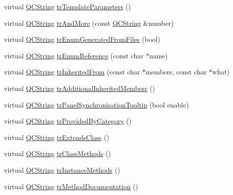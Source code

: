 \begin{DoxyCompactItemize}
\item 
virtual \mbox{\hyperlink{class_q_c_string}{Q\+C\+String}} \mbox{\hyperlink{class_translator_korean_aeae11aa112012a4945a724857f636acf}{tr\+Template\+Parameters}} ()
\item 
virtual \mbox{\hyperlink{class_q_c_string}{Q\+C\+String}} \mbox{\hyperlink{class_translator_korean_abfd2acd5bfd7852b8184b7a9c630ffc4}{tr\+And\+More}} (const \mbox{\hyperlink{class_q_c_string}{Q\+C\+String}} \&number)
\item 
virtual \mbox{\hyperlink{class_q_c_string}{Q\+C\+String}} \mbox{\hyperlink{class_translator_korean_a601868bc904ff732ec99ec5886066faa}{tr\+Enum\+Generated\+From\+Files}} (bool)
\item 
virtual \mbox{\hyperlink{class_q_c_string}{Q\+C\+String}} \mbox{\hyperlink{class_translator_korean_aa8db9bd724d8a6d8ff8ac1cc227c929a}{tr\+Enum\+Reference}} (const char $\ast$name)
\item 
virtual \mbox{\hyperlink{class_q_c_string}{Q\+C\+String}} \mbox{\hyperlink{class_translator_korean_a39ef233d8406f38840c602e193655a9a}{tr\+Inherited\+From}} (const char $\ast$members, const char $\ast$what)
\item 
virtual \mbox{\hyperlink{class_q_c_string}{Q\+C\+String}} \mbox{\hyperlink{class_translator_korean_a096ae3361ae83defe9af3576640f046e}{tr\+Additional\+Inherited\+Members}} ()
\item 
virtual \mbox{\hyperlink{class_q_c_string}{Q\+C\+String}} \mbox{\hyperlink{class_translator_korean_a446b002d4dd72752c0999337b1393ef1}{tr\+Panel\+Synchronisation\+Tooltip}} (bool enable)
\item 
virtual \mbox{\hyperlink{class_q_c_string}{Q\+C\+String}} \mbox{\hyperlink{class_translator_korean_af196b1d7279afbc65b8dda44ce762dc5}{tr\+Provided\+By\+Category}} ()
\item 
virtual \mbox{\hyperlink{class_q_c_string}{Q\+C\+String}} \mbox{\hyperlink{class_translator_korean_a75a4e4c569fcfd2d93760151477489f2}{tr\+Extends\+Class}} ()
\item 
virtual \mbox{\hyperlink{class_q_c_string}{Q\+C\+String}} \mbox{\hyperlink{class_translator_korean_a7f125d37850a9fe95e285dbce3ace5b3}{tr\+Class\+Methods}} ()
\item 
virtual \mbox{\hyperlink{class_q_c_string}{Q\+C\+String}} \mbox{\hyperlink{class_translator_korean_a65a32b76e6abc671c7d7aba9594613b1}{tr\+Instance\+Methods}} ()
\item 
virtual \mbox{\hyperlink{class_q_c_string}{Q\+C\+String}} \mbox{\hyperlink{class_translator_korean_a755dec4d84768a66ec18c401c23f5e97}{tr\+Method\+Documentation}} ()

\end{DoxyCompactItemize}
